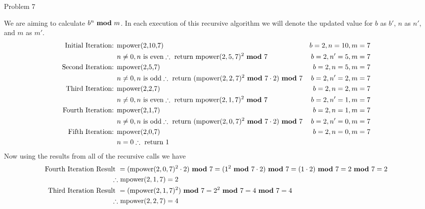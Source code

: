 \begin{problem}{Problem 7}
\begin{Highlight}[Solution - \#6]
\begin{enumerate}[label = \arabic*., start = 6]
            We are aiming to calculate $b^{n} \text{ \textbf{mod} } m$. In each execution of this recursive algorithm we will denote the updated value for $b$ as $b'$, $n$ as $n'$, and $m$ as $m'$.
            \footnotesize{
                \begin{align*}
                    \text{Initial Iteration: } & \text{mpower(2,10,7)} & b = 2, n = 10, m = 7 \\
                    & n \neq 0, n \text{ is even} \therefore \text{ return \text{mpower}}(2,5,7)^{2} \text{ \textbf{mod} } 7 & b = 2, n' = 5, m = 7 \\
                    \text{Second Iteration: } & \text{mpower(2,5,7)} & b = 2, n = 5, m = 7 \\
                    & n \neq 0, n \text{ is odd} \therefore \text{ return }(\text{mpower}(2,2,7)^{2} \text{ \textbf{mod} } 7 \cdot 2) \text{ \textbf{mod} } 7 & b = 2, n' = 2, m = 7 \\
                    \text{Third Iteration: } & \text{mpower(2,2,7)} & b = 2, n = 2, m = 7 \\
                    & n \neq 0, n \text{ is even} \therefore \text{ return \text{mpower}}(2,1,7)^{2} \text{ \textbf{mod} } 7 & b = 2, n' = 1, m = 7 \\
                    \text{Fourth Iteration: } & \text{mpower(2,1,7)} & b = 2, n = 1, m = 7 \\
                    & n \neq 0, n \text{ is odd} \therefore \text{ return }(\text{mpower}(2,0,7)^{2} \text{ \textbf{mod} } 7 \cdot 2) \text{ \textbf{mod} } 7 & b = 2, n' = 0, m = 7 \\
                    \text{Fifth Iteration: } & \text{mpower(2,0,7)} & b = 2, n = 0, m = 7 \\
                    & n = 0 \therefore \text{ return 1} &
                \end{align*}
            }
            \normalsize
            Now using the results from all of the recursive calls we have
            \footnotesize{
                \begin{align*}
                    \text{Fourth Iteration Result } & = (\text{mpower}(2,0,7)^{2} \cdot 2) \modulo 7 = (1^{2} \modulo 7 \cdot 2) \modulo 7 = (1 \cdot 2) \modulo 7 = 2 \modulo 7 = 2 \\
                    \therefore & \text{ mpower}(2,1,7) = 2 \\
                    \text{Third Iteration Result } & = (\text{mpower}(2,1,7)^{2}) \modulo 7 = 2^{2} \modulo 7 = 4 \modulo 7 = 4 \\
                    \therefore & \text{ mpower}(2,2,7) = 4 \\

\end{align*}}
\end{enumerate}
\end{Highlight}
\end{problem}
